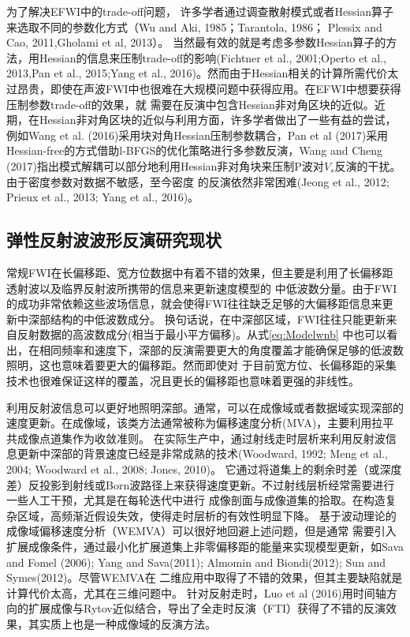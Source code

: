 为了解决EFWI中的trade-off问题，
许多学者通过调查散射模式或者Hessian算子来选取不同的参数化方式（Wu and Aki, 1985\cite{wu.aki:1985}；Tarantola, 1986\cite{tarantola:1986}；
Plessix and Cao, 2011\cite{plessix.cao:2011},Gholami et al, 2013\cite{gholami2013}）。
当然最有效的就是考虑多参数Hessian算子的方法，用Hessian的信息来压制trade-off的影响(Fichtner et al., 2001\cite{fichtner2011hessian};Operto et al.,
2013\cite{operto2013guided},Pan et al., 2015\cite{pan2015estimation};Yang et al.,
2016\cite{Yang2016})。然而由于Hessian相关的计算所需代价太过昂贵，即使在声波FWI中也很难在大规模问题中获得应用。在EFWI中想要获得压制参数trade-off的效果，就
需要在反演中包含Hessian非对角区块的近似。近期，在Hessian非对角区块的近似与利用方面，许多学者做出了一些有益的尝试，例如Wang
et al. (2016)\cite{WangYuweiEtAl2016}采用块对角Hessian压制参数耦合，Pan et
al (2017)\cite{PanEtAl2017}采用Hessian-free的方式借助l-BFGS的优化策略进行多参数反演，Wang and Cheng
 (2017)\cite{WangEtAl2017}指出模式解耦可以部分地利用Hessian非对角块来压制P波对$V_s$反演的干扰。由于密度参数对数据不敏感，至今密度
的反演依然非常困难(Jeong et al., 2012\cite{jeong2012full}; Prieux et al., 2013\cite{prieux:2013a}; Yang
et al., 2016\cite{Yang2016})。
\subsection{弹性反射波波形反演研究现状}
常规FWI在长偏移距、宽方位数据中有着不错的效果，但主要是利用了长偏移距透射波以及临界反射波所携带的信息来更新速度模型的
中低波数分量。由于FWI的成功非常依赖这些波场信息，就会使得FWI往往缺乏足够的大偏移距信息来更新中深部结构的中低波数成分。
换句话说，在中深部区域，FWI往往只能更新来自反射数据的高波数成分(相当于最小平方偏移)。从式\ref{eq:Modelwnb}
中也可以看出，在相同频率和速度下，深部的反演需要更大的角度覆盖才能确保足够的低波数照明，这也意味着要更大的偏移距。然而即使对
于目前宽方位、长偏移距的采集技术也很难保证这样的覆盖，况且更长的偏移距也意味着更强的非线性\cite{sirgue2006importance,virieux2009overview}。

利用反射波信息可以更好地照明深部。通常，可以在成像域或者数据域实现深部的速度更新。在成像域，该类方法通常被称为偏移速度分析(MVA)，主要利用拉平
共成像点道集作为收敛准则。
在实际生产中，通过射线走时层析来利用反射波信息更新中深部的背景速度已经是非常成熟的技术(Woodward,
1992\cite{Woodward1992}; Meng et al., 2004\cite{MengEtAl2004}; Woodward et al., 2008\cite{
Woodward2008}; Jones, 2010\cite{Jones2010})。
它通过将道集上的剩余时差（或深度差）反投影到射线或Born波路径上来获得速度更新。不过射线层析经常需要进行一些人工干预，尤其是在每轮迭代中进行
成像剖面与成像道集的拾取。在构造复杂区域，高频渐近假设失效，使得走时层析的有效性明显下降。
基于波动理论的成像域偏移速度分析（WEMVA）可以很好地回避上述问题，但是通常
需要引入扩展成像条件，通过最小化扩展道集上非零偏移距的能量来实现模型更新，如Sava and
Fomel (2006)\cite{SavaEtAl2006}; Yang and Sava(2011)\cite{YangEtAl2011}; Almomin and
Biondi(2012)\cite{Almomin2012}; Sun and Symes(2012)\cite{SunEtAl2012}。尽管WEMVA在
二维应用中取得了不错的效果，但其主要缺陷就是计算代价太高，尤其在三维问题中。
针对反射走时，Luo et
al (2016)\cite{Luo2016}用时间轴方向的扩展成像与Rytov近似结合，导出了全走时反演（FTI）获得了不错的反演效果，其实质上也是一种成像域的反演方法。

